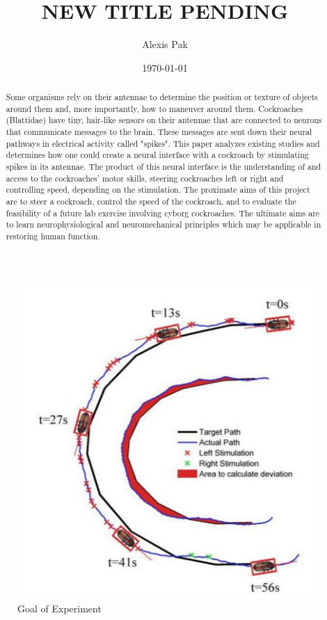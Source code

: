 \documentclass{article}
\title{NEW TITLE PENDING}
\author{Alexis Pak}
\date{\today}
\begin{document}
\maketitle
\begin{abstract}
Some organisms rely on their antennae to determine the position or texture of objects around them and, more importantly, how to maneuver around them. Cockroaches (Blattidae) have tiny, hair-like sensors on their antennae that are connected to neurons that communicate messages to the brain. These messages are sent down their neural pathways in electrical activity called "spikes". This paper analyzes existing studies and determines how one could create a neural interface with a cockroach by stimulating spikes in its antennae. The product of this neural interface is the understanding of and access to the cockroaches' motor skills, steering cockroaches left or right and controlling speed, depending on the stimulation. The proximate aims of this project are to steer a cockroach, control the speed of the cockroach, and to evaluate the feasibility of a future lab exercise involving cyborg cockroaches. The ultimate aims are to learn neurophysiological and neuromechanical principles which may be applicable in restoring human function. 
\end{abstract}

\begin{figure}[ht!]
\centering
\includegraphics[scale=0.5]{Figures/motivation1.JPG}
\caption{Goal of Experiment}
\label{fig:motivation1}
\end{figure}
\end{document}
